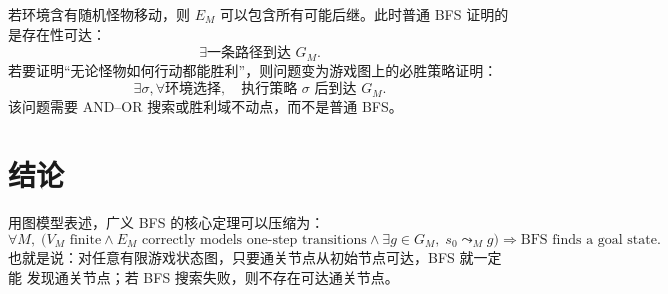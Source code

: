 \documentclass[UTF8]{ctexart}
\theoremstyle{nesylinkblock}
\begin{document}
若环境含有随机怪物移动，则 $E_M$ 可以包含所有可能后继。此时普通 BFS 证明的
是存在性可达：
\[
  \exists \text{一条路径到达 }G_M.
\]
若要证明``无论怪物如何行动都能胜利''，则问题变为游戏图上的必胜策略证明：
\[
  \exists\sigma,\forall \text{环境选择},\quad
  \text{执行策略 }\sigma\text{ 后到达 }G_M.
\]
该问题需要 AND--OR 搜索或胜利域不动点，而不是普通 BFS。

\section{结论}

用图模型表述，广义 BFS 的核心定理可以压缩为：
\[
  \forall M,\;
  \bigl(
    V_M \text{ finite}
    \land
    E_M \text{ correctly models one-step transitions}
    \land
    \exists g\in G_M,\;s_0\leadsto_M g
  \bigr)
  \Rightarrow
  \text{BFS finds a goal state}.
\]
也就是说：对任意有限游戏状态图，只要通关节点从初始节点可达，BFS 就一定能
发现通关节点；若 BFS 搜索失败，则不存在可达通关节点。
\end{document}

